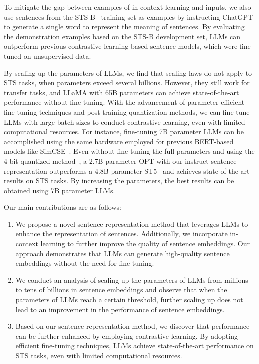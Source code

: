 \documentclass{article}
\begin{document}
To mitigate the gap between examples of in-context learning and inputs, we also use sentences from the STS-B~\cite{cer2017semeval} training set as examples by instructing ChatGPT to generate a single word to represent the meaning of sentences. By evaluating the demonstration examples based on the STS-B development set, LLMs can outperform previous contrastive learning-based sentence models, which were fine-tuned on unsupervised data.

By scaling up the parameters of LLMs, we find that scaling laws do not apply to STS tasks, when parameters exceed several billions. However, they still work for transfer tasks, and LLaMA with 65B parameters can achieve state-of-the-art performance without fine-tuning. With the advancement of parameter-efficient fine-tuning techniques\cite{hu2021lora, dettmers2023qlora} and post-training quantization methods\cite{frantar2022gptq}, we can fine-tune LLMs with large batch sizes to conduct contrastive learning, even with limited computational resources.
For instance, fine-tuning 7B parameter LLMs can be accomplished using the same hardware employed for previous BERT-based models like SimCSE~\cite{gao2021simcse}. Even without fine-tuning the full parameters and using the 4-bit quantized method~\cite{dettmers2023qlora}, a 2.7B parameter OPT with our instruct sentence representation outperforms a 4.8B parameter ST5~\cite{sentencet5} and achieves state-of-the-art results on STS tasks. By increasing the parameters, the best results can be obtained using 7B parameter LLMs.

Our main contributions are as follows:
\begin{enumerate}
    \item We propose a novel sentence representation method that leverages LLMs to enhance the representation of sentences. Additionally, we incorporate in-context learning to further improve the quality of sentence embeddings. Our approach demonstrates that LLMs can generate high-quality sentence embeddings without the need for fine-tuning.
    \item We conduct an analysis of scaling up the parameters of LLMs from millions to tens of billions in sentence embeddings and observe that when the parameters of LLMs reach a certain threshold, further scaling up does not lead to an improvement in the performance of sentence embeddings.
    \item Based on our sentence representation method, we discover that performance can be further enhanced by employing contrastive learning. By adopting efficient fine-tuning techniques, LLMs achieve state-of-the-art performance on STS tasks, even with limited computational resources.
\end{enumerate}
\end{document}
